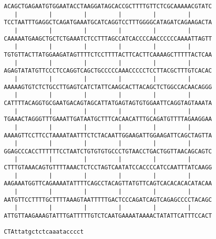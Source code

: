 \documentclass{article}
\begin{document}
\begin{Verbatim}
ACAGCTGAGAATGTGGAATACCTAAGGATAGCACCGCTTTTGTTCTCGCAAAAACGTATC
   |         |         |         |         |         |      
TCCTAATTTGAGGCTCAGATGAAATGCATCAGGTCCTTTGGGGCATAGATCAGAAGACTA
   |         |         |         |         |         |      
CAAAAATGAAGCTGCTCTGAAATCTCCTTTAGCCATCACCCCAACCCCCCAAAATTAGTT
   |         |         |         |         |         |      
TGTGTTACTTATGGAAGATAGTTTTCTCCTTTTACTTCACTTCAAAAGCTTTTTACTCAA
   |         |         |         |         |         |      
AGAGTATATGTTCCCTCCAGGTCAGCTGCCCCCAAACCCCCTCCTTACGCTTTGTCACAC
   |         |         |         |         |         |      
AAAAAGTGTCTCTGCCTTGAGTCATCTATTCAAGCACTTACAGCTCTGGCCACAACAGGG
   |         |         |         |         |         |      
CATTTTACAGGTGCGAATGACAGTAGCATTATGAGTAGTGTGGAATTCAGGTAGTAAATA
   |         |         |         |         |         |      
TGAAACTAGGGTTTGAAATTGATAATGCTTTCACAACATTTGCAGATGTTTTAGAAGGAA
   |         |         |         |         |         |      
AAAAGTTCCTTCCTAAAATAATTTCTCTACAATTGGAAGATTGGAAGATTCAGCTAGTTA
   |         |         |         |         |         |      
GGAGCCCACCTTTTTTCCTAATCTGTGTGTGCCCTGTAACCTGACTGGTTAACAGCAGTC
   |         |         |         |         |         |      
CTTTGTAAACAGTGTTTTAAACTCTCCTAGTCAATATCCACCCCATCCAATTTATCAAGG
   |         |         |         |         |         |      
AAGAAATGGTTCAGAAAATATTTTCAGCCTACAGTTATGTTCAGTCACACACACATACAA
   |         |         |         |         |         |      
AATGTTCCTTTTGCTTTTAAAGTAATTTTTGACTCCCAGATCAGTCAGAGCCCCTACAGC
   |         |         |         |         |         |      
ATTGTTAAGAAAGTATTTGATTTTTGTCTCAATGAAAATAAAACTATATTCATTTCCACT
                       
CTAttatgctctcaaatacccct
\end{Verbatim}
\end{document}
